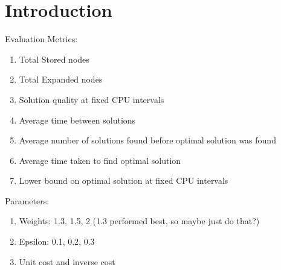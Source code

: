 \section{Introduction}

Evaluation Metrics:
\begin{enumerate}
    \item Total Stored nodes \cite{hansen2007anytime}
    \item Total Expanded nodes \cite{hansen2007anytime}
    \item Solution quality at fixed CPU intervals \cite{thayer2012better}
    \item Average time between solutions \cite{thayer2012better}
    \item Average number of solutions found before optimal solution was found
    \item Average time taken to find optimal solution
    \item Lower bound on optimal solution at fixed CPU intervals
\end{enumerate}


Parameters:
\begin{enumerate}
    \item Weights: 1.3, 1.5, 2 \cite{hansen2007anytime} (1.3 performed best, so maybe just do that?)
    \item Epsilon: 0.1, 0.2, 0.3 \cite{valenzano2014comparison}
    \item Unit cost and inverse cost
\end{enumerate}